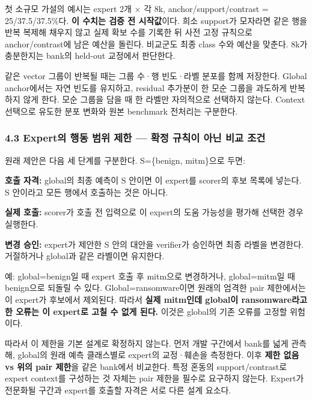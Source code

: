 첫 소규모 가설의 예시는 expert 2개 × 각 8k, anchor/\allowbreak{}support/\allowbreak{}contrast =\allowbreak{} 25/\allowbreak{}37.5/\allowbreak{}37.5\%다. \textbf{이 수치는 검증 전 시작값}이다. 희소 support가 모자라면 같은 행을 반복 복제해 채우지 않고 실제 확보 수를 기록한 뒤 사전 고정 규칙으로 anchor/\allowbreak{}contrast에 남은 예산을 돌린다. 비교군도 최종 class 수와 예산을 맞춘다. 8k가 충분한지는 bank의 held-out 교정에서 판단한다.

같은 vector 그룹이 반복될 때는 그룹 수·행 빈도·라벨 분포를 함께 저장한다. Global anchor에서는 자연 빈도를 유지하고, residual 추가분이 한 모순 그룹을 과도하게 반복하지 않게 한다. 모순 그룹을 담을 때 한 라벨만 자의적으로 선택하지 않는다. Context 선택으로 유도한 분포 변화와 원본 benchmark 전처리는 구분한다.

\subsubsection{4.3 Expert의 행동 범위 제한 — 확정 규칙이 아닌 비교 조건}
원래 제안은 다음 세 단계를 구분한다. S=\allowbreak{}\{benign, mitm\}으로 두면:

\par\noindent \textbullet\enspace \textbf{호출 자격:} global의 최종 예측이 S 안이면 이 expert를 scorer의 후보 목록에 넣는다. S 안이라고 모든 행에서 호출하는 것은 아니다.


\par\noindent \textbullet\enspace \textbf{실제 호출:} scorer가 호출 전 입력으로 이 expert의 도움 가능성을 평가해 선택한 경우 실행한다.


\par\noindent \textbullet\enspace \textbf{변경 승인:} expert가 제안한 S 안의 대안을 verifier가 승인하면 최종 라벨을 변경한다. 거절하거나 global과 같은 라벨이면 유지한다.


예: global=\allowbreak{}benign일 때 expert 호출 후 mitm으로 변경하거나, global=\allowbreak{}mitm일 때 benign으로 되돌릴 수 있다. Global=\allowbreak{}ransomware이면 원래의 엄격한 pair 제한에서는 이 expert가 후보에서 제외된다. 따라서 \textbf{실제 mitm인데 global이 ransomware라고 한 오류는 이 expert로 고칠 수 없게 된다.} 이것은 global의 기존 오류를 고정할 위험이다.

따라서 이 제한을 기본 설계로 확정하지 않는다. 먼저 개발 구간에서 bank를 넓게 관측해, global의 원래 예측 클래스별로 expert의 교정·훼손을 측정한다. 이후 \textbf{제한 없음 vs 위의 pair 제한}을 같은 bank에서 비교한다. 특정 혼동의 support/\allowbreak{}contrast로 expert context를 구성하는 것 자체는 pair 제한을 필수로 요구하지 않는다. Expert가 전문화될 구간과 expert를 호출할 자격은 서로 다른 설계 요소다.

